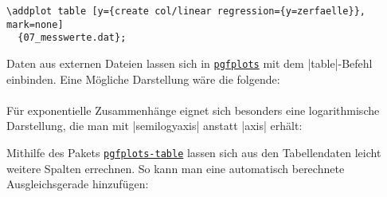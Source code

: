\documentclass{scrartcl}
\newcommand{\pkg}[1]{\href{http://ctan.org/pkg/#1}{\texttt{#1}}}
\begin{document}
\newsavebox{\SolutionCodeC}
\begin{lrbox}{\SolutionCodeC}
\begin{minipage}{\textwidth}
\begin{LTXexample}[pos=b,rframe={},preset=\centering]
\end{LTXexample}
\end{minipage}
\end{lrbox}

\newsavebox{\SolutionCodeD}
\begin{lrbox}{\SolutionCodeD}
\begin{minipage}{\textwidth}
\begin{lstlisting}
\addplot table [y={create col/linear regression={y=zerfaelle}}, mark=none]
  {07_messwerte.dat};
\end{lstlisting}
\end{minipage}
\end{lrbox}

\newpage

\begin{solution}
\noindent Daten aus externen Dateien lassen sich in \pkg{pgfplots} mit dem |table|-Befehl einbinden. Eine Mögliche Darstellung wäre die folgende:\\
\noindent\usebox\SolutionCodeC\\
\newpage
\noindent Für exponentielle Zusammenhänge eignet sich besonders eine logarithmische Darstellung, die man mit |semilogyaxis| anstatt |axis| erhält:
\begin{center}
\end{center}
Mithilfe des Pakets \pkg{pgfplots-table} lassen sich aus den Tabellendaten leicht weitere Spalten errechnen. So kann man eine automatisch berechnete Ausgleichsgerade hinzufügen:\\

\noindent\usebox\SolutionCodeD
\end{solution}
\end{document}
